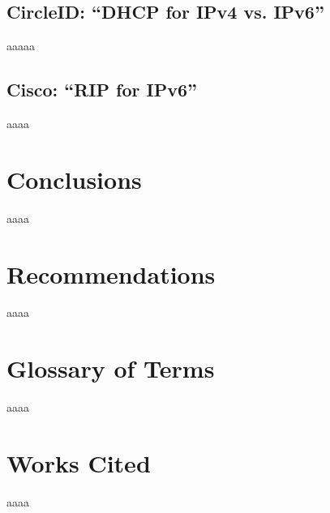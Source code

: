 \documentclass[12pt]{article}
\begin{document}
\subsection{CircleID: ``DHCP for IPv4 vs. IPv6''}
aaaaa
\subsection{Cisco: ``RIP for IPv6''}
aaaa

\section{Conclusions}
aaaa

\section{Recommendations}
aaaa

\section{Glossary of Terms}
aaaa

\section{Works Cited}
aaaa
\end{document}
